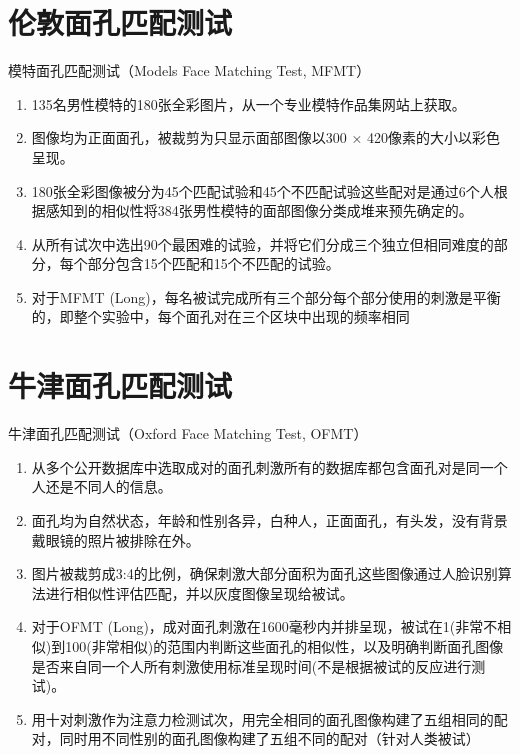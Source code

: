 \documentclass[]{ctexbook}
\providecommand{\tightlist}{%
  \setlength{\itemsep}{0pt}\setlength{\parskip}{0pt}}
\theoremstyle{definition}
\theoremstyle{definition}
\theoremstyle{definition}
\theoremstyle{definition}
\theoremstyle{remark}
\begin{document}
\section{伦敦面孔匹配测试}\label{ux4f26ux6566ux9762ux5b54ux5339ux914dux6d4bux8bd5}

模特面孔匹配测试（Models Face Matching Test, MFMT）

\begin{enumerate}
\def\labelenumi{\arabic{enumi}.}
\tightlist
\item
  135名男性模特的180张全彩图片，从一个专业模特作品集网站上获取。\\
\item
  图像均为正面面孔，被裁剪为只显示面部图像以300 × 420像素的大小以彩色呈现。\\
\item
  180张全彩图像被分为45个匹配试验和45个不匹配试验这些配对是通过6个人根据感知到的相似性将384张男性模特的面部图像分类成堆来预先确定的。\\
\item
  从所有试次中选出90个最困难的试验，并将它们分成三个独立但相同难度的部分，每个部分包含15个匹配和15个不匹配的试验。\\
\item
  对于MFMT (Long)，每名被试完成所有三个部分每个部分使用的刺激是平衡的，即整个实验中，每个面孔对在三个区块中出现的频率相同
\end{enumerate}

\section{牛津面孔匹配测试}\label{ux725bux6d25ux9762ux5b54ux5339ux914dux6d4bux8bd5}

牛津面孔匹配测试（Oxford Face Matching Test, OFMT）

\begin{enumerate}
\def\labelenumi{\arabic{enumi}.}
\tightlist
\item
  从多个公开数据库中选取成对的面孔刺激所有的数据库都包含面孔对是同一个人还是不同人的信息。\\
\item
  面孔均为自然状态，年龄和性别各异，白种人，正面面孔，有头发，没有背景戴眼镜的照片被排除在外。\\
\item
  图片被裁剪成3:4的比例，确保刺激大部分面积为面孔这些图像通过人脸识别算法进行相似性评估匹配，并以灰度图像呈现给被试。\\
\item
  对于OFMT (Long)，成对面孔刺激在1600毫秒内并排呈现，被试在1(非常不相似)到100(非常相似)的范围内判断这些面孔的相似性，以及明确判断面孔图像是否来自同一个人所有刺激使用标准呈现时间(不是根据被试的反应进行测试)。\\
\item
  用十对刺激作为注意力检测试次，用完全相同的面孔图像构建了五组相同的配对，同时用不同性别的面孔图像构建了五组不同的配对（针对人类被试）
\end{enumerate}
\end{document}
